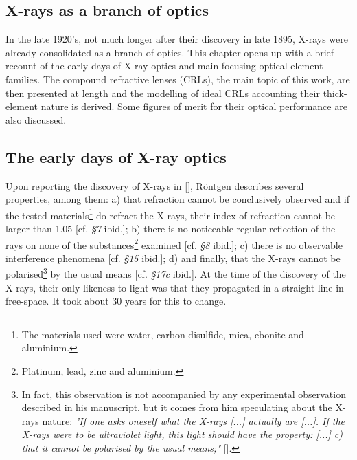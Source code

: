 \begin{refsection}
\chapter{X-rays as a branch of optics}\label{sec:x-ray_optics}

In the late 1920's, not much longer after their discovery in late 1895, X-rays were already consolidated as a branch of optics. This chapter opens up with a brief recount of the early days of X-ray optics and main focusing optical element families. The compound refractive lenses (CRLs), the main topic of this work, are then presented at length and the modelling of ideal CRLs accounting their thick-element nature is derived. Some figures of merit for their optical performance are also discussed.

\section{The early days of X-ray optics}\label{sec:early_days}

Upon reporting the discovery of  X-rays in [\cite{Roentgen1896_ch3}], R\"{o}ntgen describes several properties, among them: a) that refraction cannot be conclusively observed and if the tested materials\footnote{The materials used were water, carbon disulfide, mica, ebonite and aluminium.} do refract the X-rays, their index of refraction cannot be larger than 1.05 [cf. \textit{§7} ibid.]; b) there is no noticeable regular reflection of the rays on none of the substances\footnote{Platinum, lead, zinc and aluminium.} examined [cf. \textit{§8} ibid.]; c) there is no observable interference phenomena [cf. \textit{§15} ibid.]; d) and finally, that the X-rays cannot be polarised\footnote{In fact, this observation is not accompanied by any experimental observation described in his manuscript, but it comes from him speculating about the X-rays nature: \textit{"If one asks oneself what the X-rays [...] actually are [...]. If the X-rays were to be ultraviolet light, this light should have the property: [...] c)
that it cannot be polarised by the usual means;"} [\cite[\textit{§17}]{Roentgen1896_ch3}].} by the usual means [cf. \textit{§17c} ibid.]. At the time of the discovery of the X-rays, their only likeness to light was that they propagated in a straight line in free-space. It took about 30 years for this to change.


\end{refsection}
